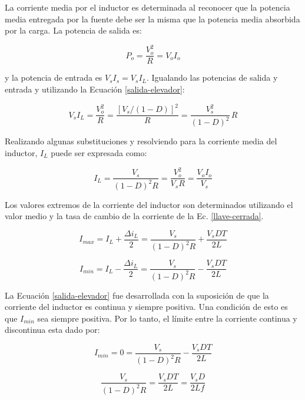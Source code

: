 La corriente media por el inductor es determinada al reconocer que la potencia media entregada por la fuente debe ser la misma que la potencia media absorbida por la carga.
La potencia de salida es:

\begin{equation*}
    P_o = \frac{V^2_o}{R} = V_o I_o
\end{equation*}

y la potencia de entrada es $V_s I_s = V_s I_L$. Igualando las potencias de salida y entrada y utilizando la Ecuación \ref{salida-elevador}:

\begin{equation*}
    V_s I_L = \frac{V_o^2}{R} = \frac{\left[ V_s / (1-D) \right]^2}{R} = \frac{V_s^2}{(1-D)^2} \, R
\end{equation*}

Realizando algunas substituciones y resolviendo para la corriente media del inductor, $I_L$ puede ser expresada como:

\begin{equation}
    \boxed{I_L = \frac{V_s}{(1-D)^2 R} = \frac{V_o^2}{V_s R} = \frac{V_o I_o}{V_s}}
\end{equation}

Los valores extremos de la corriente del inductor son determinados utilizando el valor medio y la tasa de cambio de la corriente de la Ec. \ref{llave-cerrada}.

\begin{equation}
    I_{max} = I_L + \frac{\Delta i_L}{2} = \frac{V_s}{(1-D)^2 R} + \frac{V_s D T}{2L}
\end{equation}

\begin{equation}
    I_{min} = I_L - \frac{\Delta i_L}{2} = \frac{V_s}{(1-D)^2 R} - \frac{V_s D T}{2L}
\end{equation}

La Ecuación \ref{salida-elevador} fue desarrollada con la suposición de que la corriente del inductor es continua y siempre positiva. Una condición de esto es que $I_{min}$ sea siempre positiva. Por lo tanto, el límite entre la corriente continua y discontinua esta dado por:

\begin{equation*}
    I_{min} = 0 = \frac{V_s}{(1-D)^2 R} - \frac{V_s D T}{2L} 
\end{equation*}

\begin{equation*}
    \frac{V_s}{(1-D)^2 R} = \frac{V_s D T}{2L} =\frac{V_s D}{2Lf} 
\end{equation*}

